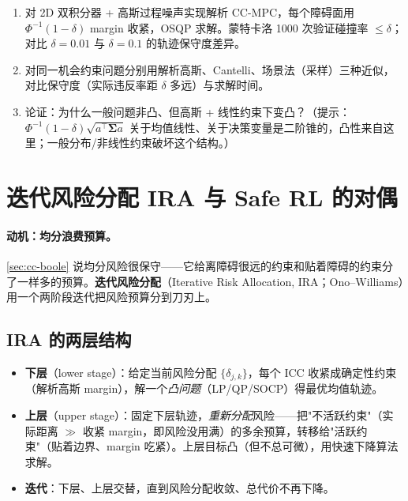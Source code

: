 \begin{practice}
\begin{enumerate}
  \item 对 2D 双积分器 + 高斯过程噪声实现解析 CC-MPC，每个障碍面用 $\Phi^{-1}(1-\delta)$ margin 收紧，OSQP 求解。蒙特卡洛 1000 次验证碰撞率 $\le\delta$；对比 $\delta=0.01$ 与 $\delta=0.1$ 的轨迹保守度差异。
  \item 对同一机会约束问题分别用解析高斯、Cantelli、场景法（采样）三种近似，对比保守度（实际违反率距 $\delta$ 多远）与求解时间。
  \item 论证：为什么一般问题非凸、但高斯 + 线性约束下变凸？（提示：$\Phi^{-1}(1-\delta)\sqrt{a^\top\boldsymbol{\Sigma}a}$ 关于均值线性、关于决策变量是二阶锥的，凸性来自这里；一般分布/非线性约束破坏这个结构。）
\end{enumerate}
\end{practice}

\section{迭代风险分配 IRA 与 Safe RL 的对偶}
\label{sec:cc-ira}

\paragraph{动机：均分浪费预算。}
\cref{sec:cc-boole} 说均分风险很保守——它给离障碍很远的约束和贴着障碍的约束分了一样多的预算。\textbf{迭代风险分配}（Iterative Risk Allocation, IRA；Ono--Williams\cite{ono2008iterative}）用一个两阶段迭代把风险预算分到刀刃上。

\subsection{IRA 的两层结构}
\label{sec:cc-ira-struct}

\begin{itemize}
  \item \textbf{下层}（lower stage）：给定当前风险分配 $\{\delta_{j,k}\}$，每个 ICC 收紧成确定性约束（解析高斯 margin），解一个\emph{凸问题}（LP/QP/SOCP）得最优均值轨迹。
  \item \textbf{上层}（upper stage）：固定下层轨迹，\emph{重新分配}风险——把"不活跃约束"（实际距离 $\gg$ 收紧 margin，即风险没用满）的多余预算，转移给"活跃约束"（贴着边界、margin 吃紧）。上层目标凸（但不总可微），用快速下降算法求解。
  \item \textbf{迭代}：下层、上层交替，直到风险分配收敛、总代价不再下降。
\end{itemize}

